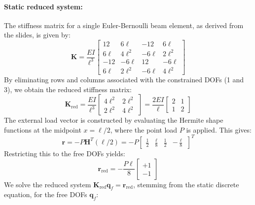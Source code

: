 \documentclass[12pt]{article}
\begin{document}
\paragraph{Static reduced system:} The stiffness matrix for a single Euler-Bernoulli beam element, as derived from the slides, is given by:
\[
    \mathbf{K} = \frac{EI}{\ell^3}
    \begin{bmatrix}
        12    & 6\ell   & -12    & 6\ell   \\
        6\ell & 4\ell^2 & -6\ell & 2\ell^2 \\
        -12   & -6\ell  & 12     & -6\ell  \\
        6\ell & 2\ell^2 & -6\ell & 4\ell^2
    \end{bmatrix}
\]
By eliminating rows and columns associated with the constrained DOFs (1 and 3), we obtain the reduced stiffness matrix:
\[
    \mathbf{K}_\text{red} = \frac{EI}{\ell^3}
    \begin{bmatrix}
        4\ell^2 & 2\ell^2 \\
        2\ell^2 & 4\ell^2
    \end{bmatrix}=  \frac{2EI}{\ell}\begin{bmatrix}
        2 & 1 \\
        1 & 2
    \end{bmatrix}
\]
The external load vector is constructed by evaluating the Hermite shape functions at the midpoint \( x = \ell/2 \), where the point load \( P \) is applied. This gives:
\[
    \mathbf{r} = -P \mathbf H^T(\ell/2) = -P \begin{bmatrix} \tfrac{1}{2} & \tfrac{\ell}{8} & \tfrac{1}{2} & -\tfrac{\ell}{8} \end{bmatrix}^T
\]
Restricting this to the free DOFs yields:
\[
    \mathbf{r}_\text{red} = -\frac{P\ell}{8} \begin{bmatrix} +1 \\ -1 \end{bmatrix}
\]
We solve the reduced system \( \mathbf{K}_\text{red} \mathbf{q}_f = \mathbf{r}_\text{red} \), stemming from the static discrete equation, for the free DOFs \( \mathbf{q}_f \):
\end{document}
